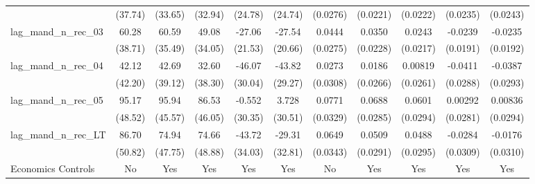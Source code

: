 {\begin{longtable}{l*{10}{c}}
                    &     (37.74)         &     (33.65)         &     (32.94)         &     (24.78)         &     (24.74)         &    (0.0276)         &    (0.0221)         &    (0.0222)         &    (0.0235)         &    (0.0243)         \\
[1em]
lag\_mand\_n\_rec\_03   &       60.28         &       60.59\sym{*}  &       49.08         &      -27.06         &      -27.54         &      0.0444         &      0.0350         &      0.0243         &     -0.0239         &     -0.0235         \\
                    &     (38.71)         &     (35.49)         &     (34.05)         &     (21.53)         &     (20.66)         &    (0.0275)         &    (0.0228)         &    (0.0217)         &    (0.0191)         &    (0.0192)         \\
[1em]
lag\_mand\_n\_rec\_04   &       42.12         &       42.69         &       32.60         &      -46.07         &      -43.82         &      0.0273         &      0.0186         &     0.00819         &     -0.0411         &     -0.0387         \\
                    &     (42.20)         &     (39.12)         &     (38.30)         &     (30.04)         &     (29.27)         &    (0.0308)         &    (0.0266)         &    (0.0261)         &    (0.0288)         &    (0.0293)         \\
[1em]
lag\_mand\_n\_rec\_05   &       95.17\sym{*}  &       95.94\sym{**} &       86.53\sym{*}  &      -0.552         &       3.728         &      0.0771\sym{**} &      0.0688\sym{**} &      0.0601\sym{**} &     0.00292         &     0.00836         \\
                    &     (48.52)         &     (45.57)         &     (46.05)         &     (30.35)         &     (30.51)         &    (0.0329)         &    (0.0285)         &    (0.0294)         &    (0.0281)         &    (0.0294)         \\
[1em]
lag\_mand\_n\_rec\_LT   &       86.70\sym{*}  &       74.94         &       74.66         &      -43.72         &      -29.31         &      0.0649\sym{*}  &      0.0509\sym{*}  &      0.0488\sym{*}  &     -0.0284         &     -0.0176         \\
                    &     (50.82)         &     (47.75)         &     (48.88)         &     (34.03)         &     (32.81)         &    (0.0343)         &    (0.0291)         &    (0.0295)         &    (0.0309)         &    (0.0310)         \\
[1em]
Economics Controls  &          No         &         Yes         &         Yes         &         Yes         &         Yes         &          No         &         Yes         &         Yes         &         Yes         &         Yes         \\

\end{longtable}}
